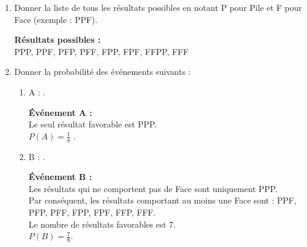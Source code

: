 \documentclass[12pt]{article}
\begin{document}
\begin{enumerate}
    \item Donner la liste de tous les résultats possibles en notant P pour Pile et F pour Face (exemple : PPF).
    
    \textbf{Résultats possibles :} \\
    PPP, PPF, PFP, PFF, FPP, FPF, FFPP, FFF

    \item Donner la probabilité des événements suivants :
    \begin{enumerate}
        \item A : .
        
        \textbf{Événement A :} \\
        Le seul résultat favorable est PPP. \\
         $P(A) = \frac{1}{8}$ .

        \item B : .
        
        \textbf{Événement B :} \\
        Les résultats qui ne comportent pas de Face sont uniquement PPP. \\
        Par conséquent, les résultats comportant au moins une Face sont : PPF, PFP, PFF, FPP, FPF, FFP, FFF. \\
        Le nombre de résultats favorables est 7. \\
         $P(B) = \frac{7}{8}$.
    \end{enumerate}
\end{enumerate}
\end{document}
